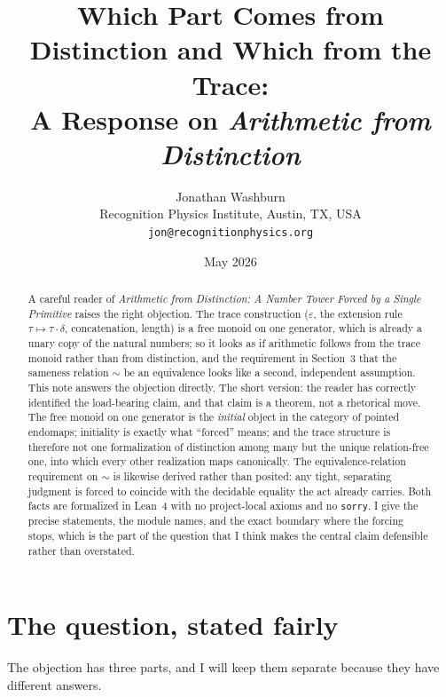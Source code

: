 \documentclass[11pt,a4paper]{article}
\title{%
  Which Part Comes from Distinction and Which from the Trace:\\
  A Response on \emph{Arithmetic from Distinction}}
\author{%
  Jonathan Washburn\\
  Recognition Physics Institute, Austin, TX, USA\\
  \texttt{jon@recognitionphysics.org}}
\date{May 2026}
\theoremstyle{definition}
\theoremstyle{remark}
\newcommand{\code}[1]{\texttt{\small #1}}
\begin{document}
\maketitle

\begin{abstract}\sloppy
A careful reader of \emph{Arithmetic from Distinction: A Number Tower Forced by
a Single Primitive} raises the right objection. The trace construction
($\varepsilon$, the extension rule $\tau \mapsto \tau\cdot\delta$, concatenation,
length) is a free monoid on one generator, which is already a unary copy of the
natural numbers; so it looks as if arithmetic follows from the trace monoid
rather than from distinction, and the requirement in Section~3 that the sameness
relation $\sim$ be an equivalence looks like a second, independent assumption.
This note answers the objection directly. The short version: the reader has
correctly identified the load-bearing claim, and that claim is a theorem, not a
rhetorical move. The free monoid on one generator is the \emph{initial} object
in the category of pointed endomaps; initiality is exactly what ``forced''
means; and the trace structure is therefore not one formalization of distinction
among many but the unique relation-free one, into which every other realization
maps canonically. The equivalence-relation requirement on $\sim$ is likewise
derived rather than posited: any tight, separating judgment is forced to
coincide with the decidable equality the act already carries. Both facts are
formalized in Lean~4 with no project-local axioms and no \code{sorry}. I give the
precise statements, the module names, and the exact boundary where the forcing
stops, which is the part of the question that I think makes the central claim
defensible rather than overstated.
\end{abstract}

\tableofcontents

\section{The question, stated fairly}\label{sec:question}

The objection has three parts, and I will keep them separate because they have
different answers.
\end{document}

